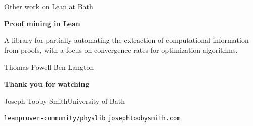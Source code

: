 \documentclass[aspectratio=169,10pt]{beamer}
\newcommand{\plbody}{\small}
\newcommand{\plmeta}{\footnotesize}
\begin{document}
\begin{frame}{Other work on Lean at Bath}
  \vfill
  \begin{center}
  \begin{tcolorbox}[enhanced, width=0.85\textwidth, arc=10pt, outer arc=10pt,
      colback=white, colframe=plrule, boxrule=1.2pt,
      left=20pt,right=20pt,top=16pt,bottom=16pt, drop fuzzy shadow={black!55}]
    {\Large\bfseries\color{plnavy}Proof mining in Lean}\\[8pt]
    {\plbody\color{plink}\raggedright A library for partially automating the extraction of
     computational information from proofs, with a focus on convergence rates
     for optimization algorithms.\par}

    \vspace{12pt}{\color{plrule}\rule{\linewidth}{0.8pt}}\vspace{8pt}

    {\plmeta\color{plmuted}Thomas Powell \;\textbullet\; Ben Langton}
  \end{tcolorbox}
  \end{center}
  \vfill
\end{frame}

{
\begin{frame}[plain]
  \vfill
  \begin{center}
    {\color{white}\fontsize{36}{40}\selectfont\bfseries
      Thank you for watching\par}

    \vspace{0.50cm}


    \vspace{0.50cm}

    {\color{plsky!25!white}\plbody Joseph Tooby-Smith\;\textbullet\;University of Bath\par}

    \vspace{0.40cm}

    {\color{white!85}\plmeta
      \href{https://github.com/leanprover-community/physlib}{%
        \color{white!85}\; \texttt{leanprover-community/physlib}}
      \qquad
      \href{https://josephtoobysmith.com/}{%
        \color{white!85}\; \texttt{josephtoobysmith.com}}\par}
  \end{center}
  \vfill
\end{frame}
}
\end{document}
